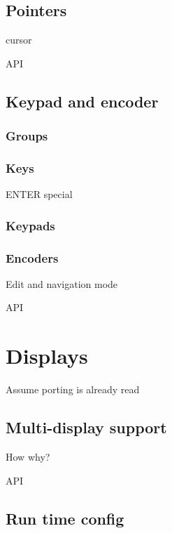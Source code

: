 \documentclass[letterpaper,10pt,english]{sphinxmanual}
\begin{document}
\subsection{Pointers}
\label{\detokenize{overview/indev:pointers}}
cursor

API


\subsection{Keypad and encoder}
\label{\detokenize{overview/indev:keypad-and-encoder}}

\subsubsection{Groups}
\label{\detokenize{overview/indev:groups}}

\subsubsection{Keys}
\label{\detokenize{overview/indev:keys}}
ENTER special


\subsubsection{Keypads}
\label{\detokenize{overview/indev:keypads}}

\subsubsection{Encoders}
\label{\detokenize{overview/indev:encoders}}
Edit and navigation mode

API


\section{Displays}
\label{\detokenize{overview/display:displays}}\label{\detokenize{overview/display::doc}}
Assume porting is already read


\subsection{Multi-display support}
\label{\detokenize{overview/display:multi-display-support}}
How why?

API


\subsection{Run time config}
\label{\detokenize{overview/display:run-time-config}}
\end{document}
